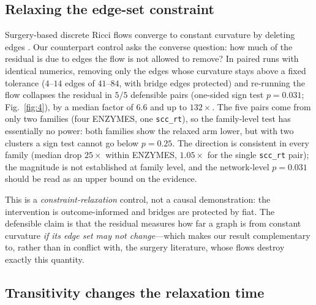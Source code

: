 \documentclass[11pt]{article}
\begin{document}
\subsection*{Relaxing the edge-set constraint}

Surgery-based discrete Ricci flows converge to constant curvature by deleting
edges \cite{MaYang2025}. Our counterpart control asks the converse question:
how much of the residual is due to edges the flow is not allowed to remove?
In paired runs with identical numerics, removing only the edges whose
curvature stays above a fixed tolerance ($4$--$14$ edges of $41$--$84$, with
bridge edges protected) and re-running the flow collapses the residual in
$5/5$ defensible pairs (one-sided sign test $p = 0.031$; Fig.~\ref{fig:4}), by
a median factor of $6.6$ and up to $132\times$. The five pairs come from only
two families (four ENZYMES, one \texttt{scc\_rt}), so the family-level test has
essentially no power: both families show the relaxed arm lower, but with two
clusters a sign test cannot go below $p = 0.25$. The direction is consistent
in every family (median drop $25\times$ within ENZYMES, $1.05\times$ for the
single \texttt{scc\_rt} pair); the magnitude is not established at family
level, and the network-level $p = 0.031$ should be read as an upper bound on
the evidence.

This is a \emph{constraint-relaxation} control, not a causal demonstration:
the intervention is outcome-informed and bridges are protected by fiat. The
defensible claim is that the residual measures how far a graph is from constant
curvature \emph{if its edge set may not change}---which makes our result
complementary to, rather than in conflict with, the surgery literature, whose
flows destroy exactly this quantity.

\subsection*{Transitivity changes the relaxation time}
\end{document}
